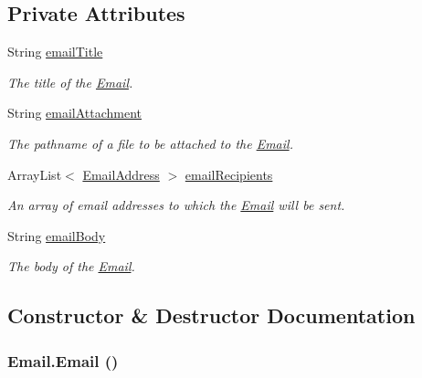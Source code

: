 \subsection*{Private Attributes}
\begin{CompactItemize}
\item 
String \hyperlink{classEmail_8e8c16b0f61a273b2460f7a412a5741a}{emailTitle}
\begin{CompactList}\small\item\em The title of the \hyperlink{classEmail}{Email}. \item\end{CompactList}\item 
String \hyperlink{classEmail_6a4739957b90500df5637ab0a9d127e9}{emailAttachment}
\begin{CompactList}\small\item\em The pathname of a file to be attached to the \hyperlink{classEmail}{Email}. \item\end{CompactList}\item 
ArrayList$<$ \hyperlink{classEmailAddress}{EmailAddress} $>$ \hyperlink{classEmail_827bd37ef7e05880918e0892f18a7450}{emailRecipients}
\begin{CompactList}\small\item\em An array of email addresses to which the \hyperlink{classEmail}{Email} will be sent. \item\end{CompactList}\item 
String \hyperlink{classEmail_39cbe20535392cc1f1277b49785a4cbe}{emailBody}
\begin{CompactList}\small\item\em The body of the \hyperlink{classEmail}{Email}. \item\end{CompactList}\end{CompactItemize}


\subsection{Constructor \& Destructor Documentation}
\hypertarget{classEmail_bd34d493c0a7128defb016941fc3869f}{
\subsubsection{\setlength{\rightskip}{0pt plus 5cm}Email.Email ()}}
\label{classEmail_bd34d493c0a7128defb016941fc3869f}


